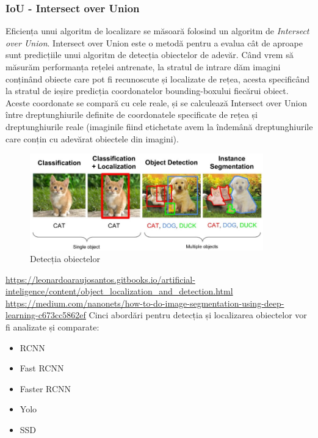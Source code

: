 \subsubsection{IoU - Intersect over Union}
Eficiența unui algoritm de localizare se măsoară folosind un algoritm de \textit{Intersect over Union}. Intersect over Union este o metodă pentru a evalua cât de aproape sunt predicțiile unui algoritm de detecția obiectelor de adevăr. \newline
Când vrem să măsurăm performanța rețelei antrenate, la stratul de intrare dăm imagini conținând obiecte care pot fi recunoscute și localizate de rețea, acesta specificând la stratul de ieșire predicția coordonatelor bounding-boxului fiecărui obiect. Aceste coordonate se compară cu cele reale, și se calculează Intersect over Union între dreptunghiurile definite de coordonatele specificate de rețea și dreptunghiurile reale (imaginile fiind etichetate avem la îndemână dreptunghiurile care conțin cu adevărat obiectele din imagini).
\begin{figure}[h!]
    	\centering
	\captionsetup{justification=centering, margin=2cm}
	\includegraphics[width=0.9\textwidth]{figures/class_detect_segment.jpeg}
	\caption{Detecția obiectelor \cite{class_detect_segment}}
	\label{fig:class_detect_segment}
\end{figure}

\url{https://leonardoaraujosantos.gitbooks.io/artificial-inteligence/content/object_localization_and_detection.html}
\url{https://medium.com/nanonets/how-to-do-image-segmentation-using-deep-learning-c673cc5862ef}
Cinci abordări pentru detecția și localizarea obiectelor vor fi analizate și comparate:
\begin{itemize}
	\item RCNN
	\item Fast RCNN
	\item Faster RCNN
	\item Yolo
	\item SSD
\end{itemize}

